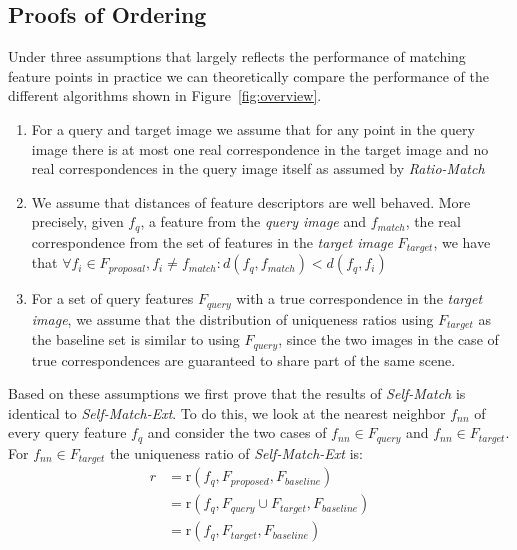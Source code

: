 \documentclass[journal]{IEEEtran}
\begin{document}
\subsection{Proofs of Ordering}

Under three assumptions that largely reflects the performance of 
matching feature points in practice we can theoretically compare the 
performance of the different algorithms shown in 
Figure~\ref{fig:overview}.

\begin{enumerate}
    \item{For a query and target image we assume that for any point in 
        the query image there is at most one real correspondence in the 
    target image and no real correspondences in the query image itself 
as assumed by \emph{Ratio-Match}}
    \item{We assume that distances of feature descriptors are well 
            behaved.  More precisely, given $f_q$, a feature from the 
            \emph{query image} and $f_{match}$, the real correspondence 
            from the set of features in the \emph{target image} 
            $F_{target}$, we have that $\forall f_i \in F_{proposal}, 
            f_i \neq f_{match}: d(f_q,f_{match}) < d(f_q, f_i)$}
     \item{For a set of query features $F_{query}$ with a true 
             correspondence in the \emph{target image}, we assume that 
             the distribution of uniqueness ratios using $F_{target}$ as 
             the baseline set is similar to using $F_{query}$, since the 
         two images in the case of true correspondences are guaranteed 
     to share part of the same scene.}
    \end{enumerate}

Based on these assumptions we first prove that the results of 
\emph{Self-Match} is identical to \emph{Self-Match-Ext}. To do this, we 
look at the nearest neighbor $f_{nn}$ of every query feature $f_{q}$ and 
consider the two cases of $f_{nn} \in F_{query}$ and $f_{nn} \in
F_{target}$. For $f_{nn} \in F_{target}$ the uniqueness ratio of 
\emph{Self-Match-Ext} is:
\begin{align*}
    r &= \text{r}(f_{q}, F_{proposed}, F_{baseline}) \\
        &= \text{r}(f_{q}, F_{query} \cup F_{target}, F_{baseline})\\
        &= \text{r}(f_{q}, F_{target}, F_{baseline})
\end{align*}
\end{document}
